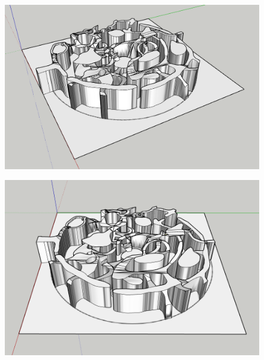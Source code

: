 \begin{figure}[H]
	\centering
	\includegraphics[width=14cm]{images/map/3D_map_003.png}
\end{figure}
\vspace*{3cm}
\begin{figure}[H]
	\centering
	\includegraphics[width=14cm]{images/map/3D_map_004.png}
\end{figure}

